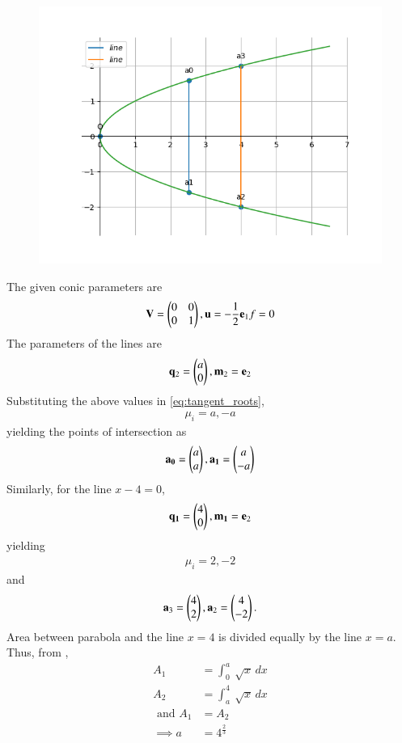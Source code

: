 	\begin{figure}[!h]
		\centering
 \includegraphics[width=\columnwidth]{chapters/12/8/1/8/figs/conics1.png}
		\caption{}
		\label{fig:12/8/1/8}
  	\end{figure}
The given conic parameters are
\begin{align}
 \mathbf{V} = \begin{pmatrix}0 & 0\\0 & 1\end{pmatrix},
	\mathbf{u} = -\frac{1}{2}\mathbf{e}_1
 f = 0
\end{align}
The parameters of the lines are
\begin{align}
\mathbf{q}_2=\begin{pmatrix}a\\0\end{pmatrix},
\mathbf{m}_2=\mathbf{e}_2
\end{align}
Substituting the above values in 
\eqref{eq:tangent_roots},
\begin{align}
\mu_i=a,-a
\end{align}
yielding  the points of  intersection as
\begin{align}
\mathbf{a_0}=\begin{pmatrix}a\\a\end{pmatrix},
\mathbf{a_1}=\begin{pmatrix}a\\-a\end{pmatrix}
\end{align}
Similarly, for the line $x-4=0$, 
\begin{align}
\mathbf{q_1}=\begin{pmatrix}4\\0\end{pmatrix},
\mathbf{m_1}=\mathbf{e}_2
\end{align}
yielding
\begin{align}
\mu_i=2,-2
\end{align}
and
\begin{align}
\mathbf{a}_3=\begin{pmatrix}4\\2\end{pmatrix},
\mathbf{a}_2=\begin{pmatrix}4\\-2\end{pmatrix}.
\end{align}
Area between parabola and the line $x=4$ is divided equally by the line $x=a$.  Thus, 
		from ,
\begin{align}
	A_1&=\int_{0}^{a} \ \sqrt{x} \,dx
	\\
	A_2&=\int_{a}^{4} \ \sqrt{x} \,dx
	\\
	\text{ and }
	A_1&=A_2 \\
\implies 
	a&=4^\frac{2}{3}
\end{align}

